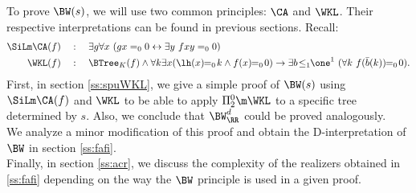 %
To prove $\BW(s)$, we will use two common principles: $\CA$ and $\WKL$. 
Their respective interpretations can be found in previous sections. Recall:
\begin{align*}
 \SiLm\CA(f)\quad&:\quad
    \exists g \forall x\ (gx=_00 \leftrightarrow \exists y\ fxy=_00)\\
 \WKL(f)\quad&:\quad
  \BTree_K(f) \wedge \forall k\exists x (\lh(x)\!\!=_0\!k \wedge f(x)\!\!=_0\!0) 
     \rightarrow \exists b\!\leq_1\!\!\one^1\ (\forall k\ f(\bar{b}(k))\!\!=_0\!0)
\text{.}
\end{align*}
First, in section \ref{ss:spuWKL}, we give a simple 
proof of $\BW(s)$ using $\SiLm\CA(f)$ and $\WKL$
to be able to apply $\Pi^0_2\m\WKL$ to a specific tree determined by $s$. Also, we conclude that
$\BW^d_\RR$ could be proved analogously.\\
We analyze a minor modification of this proof and obtain the D-interpretation
of $\BW$ in section \ref{ss:fafi}.\\
Finally, in section \ref{ss:acr}, we discuss the complexity of the realizers 
obtained in \ref{ss:fafi} depending on the way the $\BW$ principle is used in
a given proof.

